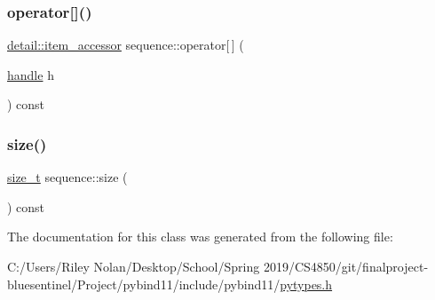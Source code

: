 \mbox{\label{classsequence_a2c7987585276aebba74a9463f6a458e0}} 
\subsubsection{\texorpdfstring{operator[]()}{operator[]()}\hspace{0.1cm}{\footnotesize\ttfamily [2/2]}}
{\footnotesize\ttfamily \mbox{\hyperlink{pytypes_8h_a9907d3edf962653e33d36bccc8b8a268}{detail\+::item\+\_\+accessor}} sequence\+::operator\mbox{[}$\,$\mbox{]} (\begin{DoxyParamCaption}\item[{\mbox{\hyperlink{classhandle}{handle}}}]{h }\end{DoxyParamCaption}) const\hspace{0.3cm}{\ttfamily [inline]}}

\mbox{\label{classsequence_af35c852590d4618481b22030d82de2ff}} 
\subsubsection{\texorpdfstring{size()}{size()}}
{\footnotesize\ttfamily \mbox{\hyperlink{detail_2common_8h_a801d6a451a01953ef8cbae6feb6a3638}{size\+\_\+t}} sequence\+::size (\begin{DoxyParamCaption}{ }\end{DoxyParamCaption}) const\hspace{0.3cm}{\ttfamily [inline]}}



The documentation for this class was generated from the following file\+:\begin{DoxyCompactItemize}
\item 
C\+:/\+Users/\+Riley Nolan/\+Desktop/\+School/\+Spring 2019/\+C\+S4850/git/finalproject-\/bluesentinel/\+Project/pybind11/include/pybind11/\mbox{\hyperlink{pytypes_8h}{pytypes.\+h}}\end{DoxyCompactItemize}
